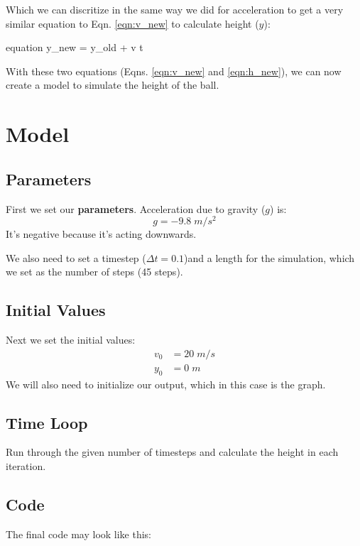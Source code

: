 \documentclass[11pt,fleqn]{book}
\begin{document}
  	Which we can discritize in the same way we did for acceleration to get a very similar equation to Eqn. \ref{eqn:v_new} to calculate height ($y$):
  	\begin{empheq}[box=\fbox]{equation}
  		\label{eqn:h_new}
  		y_{new} = y_{old} + v \cdot \Delta t
  	\end{empheq}
  	
  	With these two equations (Eqns. \ref{eqn:v_new} and \ref{eqn:h_new}), we can now create a model to simulate the height of the ball.


  \section{Model}
	
	\subsection{Parameters}
	First we set our \textbf{parameters}. Acceleration due to gravity ($g$) is:
	\begin{equation}
		g = -9.8 \; m/s^2
	\end{equation}
	It's negative because it's acting downwards.
	
	We also need to set a timestep ($\Delta t = 0.1$)and a length for the simulation, which we set as the number of steps (45 steps).

	\subsection{Initial Values}
	Next we set the initial values:
	\begin{eqnarray}
		v_0 &= 20 \; m/s \\
		y_0 &= 0  \; m
	\end{eqnarray}
	We will also need to initialize our output, which in this case is the graph.
	
	\subsection{Time Loop}
	Run through the given number of timesteps and calculate the height in each iteration.
	
	\subsection{Code}
	The final code may look like this:

	
	
\end{document}
